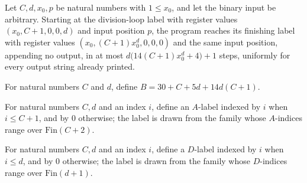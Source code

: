 \begin{lemma}
\label{Complexity.UTab.Front.goes_dloop}
\leanok
{}
Let $C,d,x_0,p$ be natural numbers with $1\le x_0$, and let the binary input be
arbitrary. Starting at the division-loop label with register values $(x_0,C+1,0,0,d)$
and input position $p$, the program reaches its finishing label with register values
$(x_0,(C+1)x_0^d,0,0,0)$ and the same input position, appending no output, in at most
$d\bigl(14(C+1)x_0^d+4\bigr)+1$ steps, uniformly for every output string already
printed.
\end{lemma}

\begin{definition}
\label{Complexity.UTab.Front.bnd}
\leanok
For natural numbers $C$ and $d$, define $B=30+C+5d+14d(C+1)$.
\end{definition}

\begin{definition}
\label{Complexity.UTab.Front.labA}
\leanok
{}
For natural numbers $C,d$ and an index $i$, define an $A$-label indexed by $i$ when
$i\le C+1$, and by $0$ otherwise; the label is drawn from the family whose $A$-indices
range over $\text{Fin}(C+2)$.
\end{definition}

\begin{definition}
\label{Complexity.UTab.Front.labD}
\leanok
{}
For natural numbers $C,d$ and an index $i$, define a $D$-label indexed by $i$ when $i\le
d$, and by $0$ otherwise; the label is drawn from the family whose $D$-indices range
over $\text{Fin}(d+1)$.
\end{definition}

